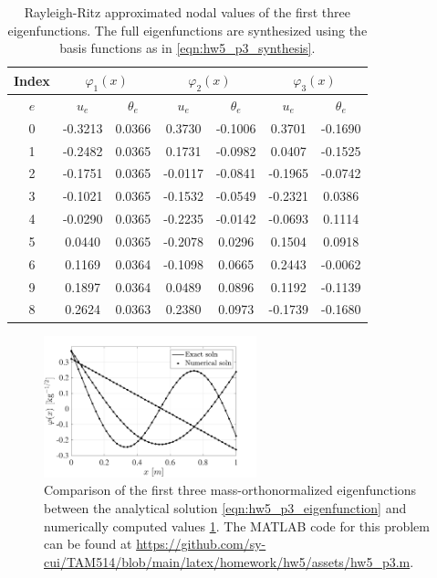 \begin{enumerate}[(i)]
{    \begin{table}[!ht]
    \centering
    \begin{tabular}{|c|c|c|c|c|c|c|}
        \hline 
        Index & \multicolumn{2}{|c|}{$\varphi_1(x)$} & \multicolumn{2}{|c|}{$\varphi_2(x)$} & \multicolumn{2}{|c|}{$\varphi_3(x)$} \\ \hline 
        $e$ & $u_e$ & $\theta_e$ & $u_e$ & $\theta_e$ & $u_e$ & $\theta_e$ \\ \hline
        0 & -0.3213 & 0.0366 &  0.3730 & -0.1006 &  0.3701 & -0.1690 \\ \hline
        1 & -0.2482 & 0.0365 &  0.1731 & -0.0982 &  0.0407 & -0.1525 \\ \hline
        2 & -0.1751 & 0.0365 & -0.0117 & -0.0841 & -0.1965 & -0.0742 \\ \hline
        3 & -0.1021 & 0.0365 & -0.1532 & -0.0549 & -0.2321 &  0.0386 \\ \hline
        4 & -0.0290 & 0.0365 & -0.2235 & -0.0142 & -0.0693 &  0.1114 \\ \hline
        5 &  0.0440 & 0.0365 & -0.2078 &  0.0296 &  0.1504 &  0.0918 \\ \hline
        6 &  0.1169 & 0.0364 & -0.1098 &  0.0665 &  0.2443 & -0.0062 \\ \hline
        9 &  0.1897 & 0.0364 &  0.0489 &  0.0896 &  0.1192 & -0.1139 \\ \hline
        8 &  0.2624 & 0.0363 &  0.2380 &  0.0973 & -0.1739 & -0.1680 \\ \hline
    \end{tabular}
    \caption{Rayleigh-Ritz approximated nodal values of the first three eigenfunctions. The full eigenfunctions are synthesized using the basis functions as in \cref{eqn:hw5_p3_synthesis}.}\label{tab:hw5_p3_data}
    \end{table}
    \begin{figure}[!ht]
        \centering
        \includegraphics[width=0.55\textwidth]{homework/hw5/assets/hw5_p3_eigfunc.pdf}
        \caption{Comparison of the first three mass-orthonormalized eigenfunctions between the analytical solution \cref{eqn:hw5_p3_eigenfunction} and numerically computed values \cref{tab:hw5_p3_data}. The MATLAB code for this problem can be found at \url{https://github.com/sy-cui/TAM514/blob/main/latex/homework/hw5/assets/hw5_p3.m}. }\label{fig:hw5_p3_eigfunc}
    \end{figure}
    
}
\end{enumerate}

